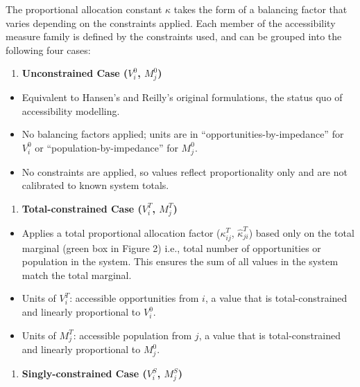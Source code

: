 \documentclass[
  10pt,
  letterpaper,
]{article}
\providecommand{\tightlist}{%
  \setlength{\itemsep}{0pt}\setlength{\parskip}{0pt}}
\begin{document}
The proportional allocation constant \(\kappa\) takes the form of a
balancing factor that varies depending on the constraints applied. Each
member of the accessibility measure family is defined by the constraints
used, and can be grouped into the following four cases:

\begin{enumerate}
\def\labelenumi{\arabic{enumi}.}
\tightlist
\item
  \textbf{Unconstrained Case (\(V_i^0\), \(M_j^0\))}
\end{enumerate}

\begin{itemize}
\tightlist
\item
  Equivalent to Hansen's \citep{hansen1959} and Reilly's
  \citep{reilly1929methods} original formulations, the status quo of
  accessibility modelling.
\item
  No balancing factors applied; units are in
  ``opportunities-by-impedance'' for \(V_i^0\) or
  ``population-by-impedance'' for \(M_j^0\).
\item
  No constraints are applied, so values reflect proportionality only and
  are not calibrated to known system totals.
\end{itemize}

\begin{enumerate}
\def\labelenumi{\arabic{enumi}.}
\setcounter{enumi}{1}
\tightlist
\item
  \textbf{Total-constrained Case (\(V_i^T\), \(M_j^T\))}
\end{enumerate}

\begin{itemize}
\tightlist
\item
  Applies a total proportional allocation factor (\(\kappa_{ij}^T\),
  \(\hat \kappa_{ji}^T\)) based only on the total marginal (green box in
  Figure 2) i.e., total number of opportunities or population in the
  system. This ensures the sum of all values in the system match the
  total marginal.
\item
  Units of \(V_i^T\): accessible opportunities from \(i\), a value that
  is total-constrained and linearly proportional to \(V_i^0\).
\item
  Units of \(M_j^T\): accessible population from \(j\), a value that is
  total-constrained and linearly proportional to \(M_j^0\).
\end{itemize}

\begin{enumerate}
\def\labelenumi{\arabic{enumi}.}
\setcounter{enumi}{2}
\tightlist
\item
  \textbf{Singly-constrained Case (\(V_i^S\), \(M_j^S\))}
\end{enumerate}
\end{document}
